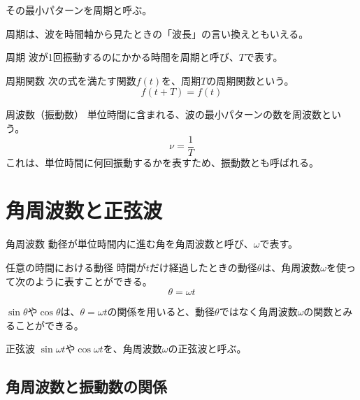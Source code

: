\documentclass[../imaging-math]{subfiles}
\begin{document}
その最小パターンを周期と呼ぶ。

周期は、波を時間軸から見たときの「波長」の言い換えともいえる。

\begin{definition}{周期}
  波が1回振動するのにかかる時間を周期と呼び、$T$で表す。
\end{definition}

\begin{definition}{周期関数}
  次の式を満たす関数$f(t)$を、周期$T$の周期関数という。
  \LARGE
  \begin{equation}
    f(t+T) = f(t)
  \end{equation}
\end{definition}

\begin{definition}{周波数（振動数）}
  \titlegap
  単位時間に含まれる、波の最小パターンの数を周波数という。
  \LARGE
  \begin{equation}
    \nu = \dfrac{1}{T}
  \end{equation}
  \normalsize
  これは、単位時間に何回振動するかを表すため、振動数とも呼ばれる。
\end{definition}

\section{角周波数と正弦波}

\begin{definition}{角周波数}
  動径が単位時間内に進む角を角周波数と呼び、$\omega$で表す。
\end{definition}

\begin{theorem}{任意の時間における動径}
  \titlegap
  時間が$t$だけ経過したときの動径$\theta$は、角周波数$\omega$を使って次のように表すことができる。
  \LARGE
  \begin{equation}
    \theta = \omega t
  \end{equation}
\end{theorem}

$\sin\theta$や$\cos\theta$は、$\theta=\omega t$の関係を用いると、動径$\theta$ではなく角周波数$\omega$の関数とみることができる。

\begin{definition}{正弦波}
  $\sin\omega t$や$\cos\omega t$を、角周波数$\omega$の正弦波と呼ぶ。
\end{definition}

\subsection{角周波数と振動数の関係}
\end{document}
